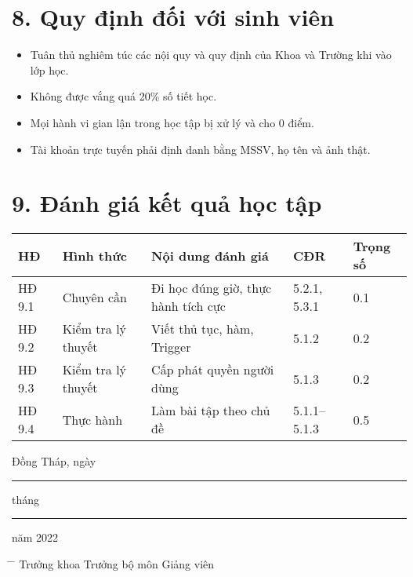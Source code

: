 \documentclass[a4paper,13pt]{article}
\begin{document}
\section*{8. Quy định đối với sinh viên}
\begin{itemize}
    \item Tuân thủ nghiêm túc các nội quy và quy định của Khoa và Trường khi vào lớp học.
    \item Không được vắng quá 20\% số tiết học.
    \item Mọi hành vi gian lận trong học tập bị xử lý và cho 0 điểm.
    \item Tài khoản trực tuyến phải định danh bằng MSSV, họ tên và ảnh thật.
\end{itemize}

\section*{9. Đánh giá kết quả học tập}
\begin{longtable}{|p{2cm}|p{3cm}|p{5cm}|p{2cm}|p{1.5cm}|}
\hline
\textbf{HĐ} & \textbf{Hình thức} & \textbf{Nội dung đánh giá} & \textbf{CĐR} & \textbf{Trọng số} \\
\hline
HĐ 9.1 & Chuyên cần & Đi học đúng giờ, thực hành tích cực & 5.2.1, 5.3.1 & 0.1 \\
\hline
HĐ 9.2 & Kiểm tra lý thuyết & Viết thủ tục, hàm, Trigger & 5.1.2 & 0.2 \\
\hline
HĐ 9.3 & Kiểm tra lý thuyết & Cấp phát quyền người dùng & 5.1.3 & 0.2 \\
\hline
HĐ 9.4 & Thực hành & Làm bài tập theo chủ đề & 5.1.1–5.1.3 & 0.5 \\
\hline
\end{longtable}

\vspace{2em}
\noindent Đồng Tháp, ngày \rule{2cm}{0.2pt} tháng \rule{2cm}{0.2pt} năm 2022

\vspace{2em}
\begin{tabbing}
\hspace{6cm} \= \hspace{6cm} \= \kill
Trưởng khoa \> Trưởng bộ môn \> Giảng viên
\end{tabbing}
\end{document}

